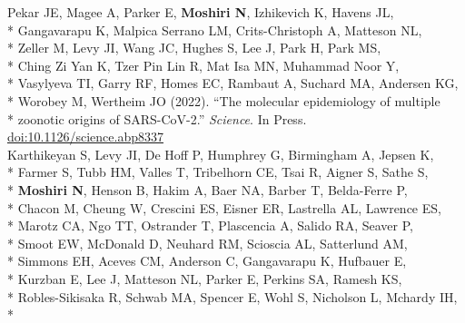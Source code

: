 \documentclass[margin,line]{res}
\begin{document}
\begin{resume}
\hspace*{4mm} Pekar JE, Magee A, Parker E, \textbf{Moshiri N}, Izhikevich K, Havens JL,\\*
\hspace*{9mm} Gangavarapu K, Malpica Serrano LM, Crits-Christoph A, Matteson NL,\\*
\hspace*{9mm} Zeller M, Levy JI, Wang JC, Hughes S, Lee J, Park H, Park MS,\\*
\hspace*{9mm} Ching Zi Yan K, Tzer Pin Lin R, Mat Isa MN, Muhammad Noor Y,\\*
\hspace*{9mm} Vasylyeva TI, Garry RF, Homes EC, Rambaut A, Suchard MA, Andersen KG,\\*
\hspace*{9mm} Worobey M, Wertheim JO (2022). ``The molecular epidemiology of multiple\\*\vspace{2mm}
\hspace*{9mm} zoonotic origins of SARS-CoV-2.'' \textit{Science}. In Press. \href{https://doi.org/10.1126/science.abp8337}{doi:10.1126/science.abp8337}\\
\hspace*{4mm} Karthikeyan S, Levy JI, De Hoff P, Humphrey G, Birmingham A, Jepsen K,\\*
\hspace*{9mm} Farmer S, Tubb HM, Valles T, Tribelhorn CE, Tsai R, Aigner S, Sathe S,\\*
\hspace*{9mm} \textbf{Moshiri N}, Henson B, Hakim A, Baer NA, Barber T, Belda-Ferre P,\\*
\hspace*{9mm} Chacon M, Cheung W, Crescini ES, Eisner ER, Lastrella AL, Lawrence ES,\\*
\hspace*{9mm} Marotz CA, Ngo TT, Ostrander T, Plascencia A, Salido RA, Seaver P,\\*
\hspace*{9mm} Smoot EW, McDonald D, Neuhard RM, Scioscia AL, Satterlund AM,\\*
\hspace*{9mm} Simmons EH, Aceves CM, Anderson C, Gangavarapu K, Hufbauer E,\\*
\hspace*{9mm} Kurzban E, Lee J, Matteson NL, Parker E, Perkins SA, Ramesh KS,\\*
\hspace*{9mm} Robles-Sikisaka R, Schwab MA, Spencer E, Wohl S, Nicholson L, Mchardy IH,\\*

\end{resume}
\end{document}
